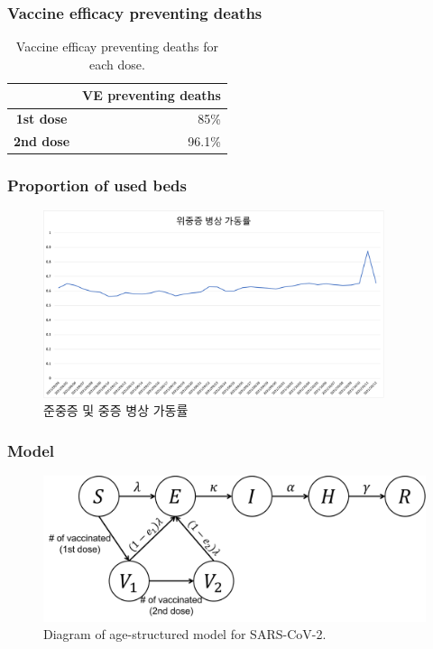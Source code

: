 \documentclass[aspectratio=169, 9pt, xcolor=dvipsnames]{beamer}
\begin{document}
	\begin{frame}\frametitle{Vaccine efficacy preventing deaths}
	    \begin{table}
	    	\begin{tabular}{cr}
	    		\toprule
	    		 & \textbf{VE preventing deaths} \\
	    		\midrule
	    		\textbf{1st dose} & 85\%\footnotemark[3] \\
	    		\textbf{2nd dose} & 96.1\%\footnotemark[4] \\
	    		\bottomrule
	    	\end{tabular}
	    	\caption{Vaccine efficay preventing deaths for each dose.}
	    \end{table}
	\end{frame}

	\begin{frame}\frametitle{Proportion of used beds}
	    \begin{figure}
	    	\includegraphics[width=10cm]{beds.png}
	    	\caption{준중증 및 중증 병상 가동률}
	    \end{figure}
	\end{frame}

	\begin{frame}\frametitle{Model}
	    \begin{figure}
	    	\centering
	    	\includegraphics[width=12cm]{diagram.pdf}
	    	\caption{Diagram of age-structured model for SARS-CoV-2.}
	    \end{figure}
	\end{frame}
\end{document}

